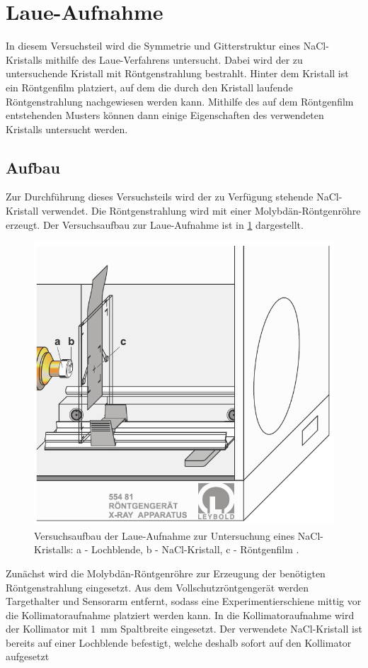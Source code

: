 \section{Laue-Aufnahme}\label{sec:laue}
In diesem Versuchsteil wird die Symmetrie und Gitterstruktur eines NaCl-Kristalls mithilfe des Laue-Verfahrens untersucht. Dabei wird der zu
untersuchende Kristall mit Röntgenstrahlung bestrahlt. Hinter dem Kristall ist ein Röntgenfilm platziert, auf dem die durch den Kristall laufende
Röntgenstrahlung nachgewiesen werden kann. Mithilfe des auf dem Röntgenfilm entstehenden Musters können dann einige Eigenschaften des verwendeten
Kristalls untersucht werden.
\subsection{Aufbau}\label{subsec:laue_aufbau}
Zur Durchführung dieses Versuchsteils wird der zu Verfügung stehende NaCl-Kristall verwendet. Die Röntgenstrahlung wird mit einer Molybdän-Röntgenröhre
erzeugt. Der Versuchsaufbau zur Laue-Aufnahme ist in \cref{fig:aufbau_laue} dargestellt.
\begin{figure}[H]
	\centering
	\includegraphics[width=0.6\linewidth]{../figs/aufbau_laue.png}
	\caption{Versuchsaufbau der Laue-Aufnahme zur Untersuchung eines NaCl-Kristalls:
    a - Lochblende, b - NaCl-Kristall, c - Röntgenfilm  \cite{laue_handblatt}.}
	\label{fig:aufbau_laue}
\end{figure} Zunächst wird die Molybdän-Röntgenröhre zur Erzeugung der benötigten Röntgenstrahlung eingesetzt. Aus dem Vollschutzröntgengerät werden Targethalter
und Sensorarm entfernt, sodass eine Experimentierschiene mittig vor die Kollimatoraufnahme platziert werden kann. In die Kollimatoraufnahme wird der Kollimator
mit \SI{1}{\milli \meter} Spaltbreite eingesetzt. Der verwendete NaCl-Kristall ist bereits auf einer Lochblende befestigt, welche deshalb sofort auf den Kollimator aufgesetzt
